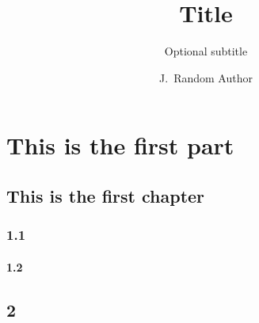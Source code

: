 \documentclass[whitelogo]{tudelft-report}
\begin{document}
\frontmatter

\title[tudelft-white]{Title}
\subtitle[tudelft-cyan]{Optional subtitle}
\author[tudelft-white]{J.\ Random Author}
\titleoffsetx{10cm}
\titleoffsety{10cm}
\afiloffsetx{1cm}
\afiloffsety{18cm}
\makecover



%

%

\tableofcontents


\mainmatter

\part{This is the first part}
\chapter {This is the first chapter}
\section {1.1}
\subsection {1.2}

\chapter {2}
\end{document}
